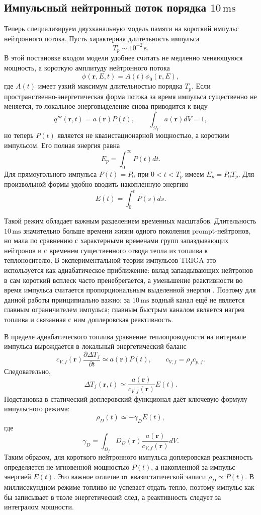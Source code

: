 \documentclass[12pt]{article}
\begin{document}
\subsection{Импульсный нейтронный поток порядка \(10\,\mathrm{ms}\)}
\label{subsec:pulse10ms}

Теперь специализируем двухканальную модель памяти на короткий импульс нейтронного потока. Пусть характерная длительность импульса
\[
T_p\sim 10^{-2}\,\mathrm{s}.
\]
В этой постановке входом модели удобнее считать не медленно меняющуюся мощность, а короткую амплитуду нейтронного потока
\[
\phi(\mathbf r,E,t)=A(t)\phi_0(\mathbf r,E),
\]
где \(A(t)\) имеет узкий максимум длительностью порядка \(T_p\). Если пространственно-энергетическая форма потока за время импульса существенно не меняется, то локальное энерговыделение снова приводится к виду
\[
q'''(\mathbf r,t)=a(\mathbf r)P(t),
\qquad
\int_{\Omega_f}a(\mathbf r)dV=1,
\]
но теперь \(P(t)\) является не квазистационарной мощностью, а коротким импульсом. Его полная энергия равна
\[
E_p=\int_0^{\infty}P(t)dt.
\]
Для прямоугольного импульса \(P(t)=P_0\) при \(0<t<T_p\) имеем \(E_p=P_0T_p\). Для произвольной формы удобно вводить накопленную энергию
\[
E(t)=\int_0^tP(s)ds.
\]

Такой режим обладает важным разделением временных масштабов. Длительность \(10\,\mathrm{ms}\) значительно больше времени жизни одного поколения prompt-нейтронов, но мала по сравнению с характерными временами групп запаздывающих нейтронов и с временем существенного отвода тепла из топлива к теплоносителю. В экспериментальной теории импульсов TRIGA это используется как адиабатическое приближение: вклад запаздывающих нейтронов в сам короткий всплеск часто пренебрегается, а уменьшение реактивности во время импульса считается пропорциональным выделенной энергии \cite{IAEATRIGAPulseExperiment,Svajger2024PulseExperiments}. Поэтому для данной работы принципиально важно: за \(10\,\mathrm{ms}\) водный канал ещё не является главным ограничителем импульса; главным быстрым каналом является нагрев топлива и связанная с ним доплеровская реактивность.

В пределе адиабатического топлива уравнение теплопроводности на интервале импульса вырождается в локальный энергетический баланс
\[
c_{V,f}(\mathbf r)\frac{\partial \Delta T_f}{\partial t}
\simeq
a(\mathbf r)P(t),
\qquad
c_{V,f}=\rho_fc_{p,f}.
\]
Следовательно,
\[
\Delta T_f(\mathbf r,t)
\simeq
\frac{a(\mathbf r)}{c_{V,f}(\mathbf r)}E(t).
\]
Подстановка в статический доплеровский функционал даёт ключевую формулу импульсного режима:
\[
\rho_D(t)
\simeq
-\gamma_D E(t),
\]
где
\[
\gamma_D=
\int_{\Omega_f}
D_D(\mathbf r)
\frac{a(\mathbf r)}{c_{V,f}(\mathbf r)}dV.
\]
Таким образом, для короткого нейтронного импульса доплеровская реактивность определяется не мгновенной мощностью \(P(t)\), а накопленной за импульс энергией \(E(t)\). Это важное отличие от квазистатической записи \(\rho_D\propto P(t)\). В миллисекундном режиме топливо не успевает отдать тепло, поэтому импульс как бы записывает в твэле энергетический след, а реактивность следует за интегралом мощности.
\end{document}
